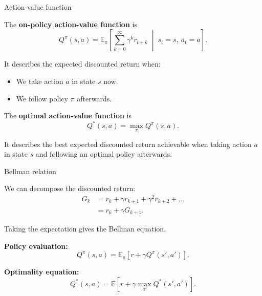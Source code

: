 \documentclass{beamer}
\begin{document}
\begin{frame}{Action-value function}
	
	\begin{flushleft}
	The \textbf{on-policy action-value function} is
	\[
	Q^\pi(s,a)=
	\mathbb{E}_\pi\left[
	\sum_{k=0}^{\infty}\gamma^k r_{t+k}
	\;\middle|\;
	s_t=s,\ a_t=a
	\right].
	\]
	
	\vspace{0.2cm}
	
	It describes the expected discounted return when:
	\begin{itemize}
		\item We take action $a$ in state $s$ now.
		\item We follow policy $\pi$ afterwards.
	\end{itemize}
	
	\vspace{0.3cm}
	
	The \textbf{optimal action-value function} is
	\[
	Q^*(s,a)=\max_\pi Q^\pi(s,a).
	\]
	
	It describes the best expected discounted return achievable
	when taking action $a$ in state $s$ and following an
	optimal policy afterwards.
	
	\end{flushleft}
\end{frame}


\begin{frame}{Bellman relation}
	\begin{flushleft}
	
	We can decompose the discounted return:
	\[
	\begin{aligned}
		G_k
		&=r_k+\gamma r_{k+1}+\gamma^2r_{k+2}+\ldots\\
		&=r_k+\gamma G_{k+1}.
	\end{aligned}
	\]
	
	\vspace{0.3cm}
	
	Taking the expectation gives the Bellman equation.
	
	\textbf{Policy evaluation:}
	\[
	Q^\pi(s,a)=
	\mathbb{E}_\pi\left[
	r+\gamma Q^\pi(s',a')
	\right].
	\]
	
	\vspace{0.2cm}
	
	\textbf{Optimality equation:}
	\[
	Q^*(s,a)=
	\mathbb{E}\left[
	r+\gamma\max_{a'}Q^*(s',a')
	\right].
	\]
	
	\end{flushleft}
\end{frame}
\end{document}
